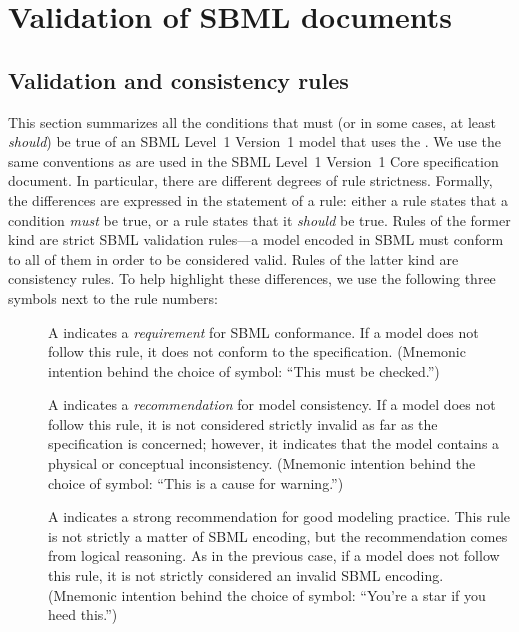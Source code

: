 
\section{Validation of SBML documents}
\label{apdx-validation}

\subsection{Validation and consistency rules}
\label{validation-rules}

This section summarizes all the conditions that must (or in some cases,
at least \emph{should}) be true of an SBML Level~1 Version~1 model that
uses the \SEDMLPackage. We use the same conventions as are used in the
SBML Level~1 Version~1 Core specification document. In particular, there
are different degrees of rule strictness. Formally, the differences are
expressed in the statement of a rule: either a rule states that a
condition \emph{must} be true, or a rule states that it \emph{should} be
true. Rules of the former kind are strict SBML validation rules---a
model encoded in SBML must conform to all of them in order to be
considered valid. Rules of the latter kind are consistency rules. To
help highlight these differences, we use the following three symbols
next to the rule numbers:

\begin{description}

\item[\hspace*{6.5pt}\vSymbol\vsp] A \vSymbolName indicates a
\emph{requirement} for SBML conformance. If a model does not follow this
rule, it does not conform to the \SEDMLPackage specification. (Mnemonic
intention behind the choice of symbol: ``This must be checked.'')

\item[\hspace*{6.5pt}\cSymbol\csp] A \cSymbolName indicates a
\emph{recommendation} for model consistency. If a model does not follow
this rule, it is not considered strictly invalid as far as the
\SEDMLPackage specification is concerned; however, it indicates that the
model contains a physical or conceptual inconsistency. (Mnemonic
intention behind the choice of symbol: ``This is a cause for warning.'')

\item[\hspace*{6.5pt}\mSymbol\msp] A \mSymbolName indicates a strong
recommendation for good modeling practice. This rule is not strictly a
matter of SBML encoding, but the recommendation comes from logical
reasoning. As in the previous case, if a model does not follow this
rule, it is not strictly considered an invalid SBML encoding. (Mnemonic
intention behind the choice of symbol: ``You're a star if you heed
this.'')

\end{description}

